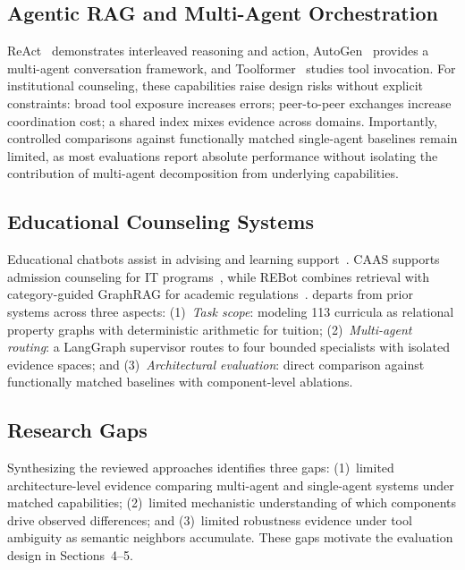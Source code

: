 \subsection{Agentic RAG and Multi-Agent Orchestration}
\label{sec:agentic_multiagent}

ReAct~\cite{yao2023react} demonstrates interleaved reasoning and action, AutoGen~\cite{wu2023autogen} provides a multi-agent conversation framework, and Toolformer~\cite{schick2023toolformer} studies tool invocation. For institutional counseling, these capabilities raise design risks without explicit constraints: broad tool exposure increases errors; peer-to-peer exchanges increase coordination cost; a shared index mixes evidence across domains. Importantly, controlled comparisons against functionally matched single-agent baselines remain limited, as most evaluations report absolute performance without isolating the contribution of multi-agent decomposition from underlying capabilities.

\subsection{Educational Counseling Systems}
\label{sec:educational_counseling}

Educational chatbots assist in advising and learning support~\cite{wollny2021chatbots}. CAAS supports admission counseling for IT programs~\cite{ma2023caas}, while REBot combines retrieval with category-guided GraphRAG for academic regulations~\cite{ma2025rebot}. \system{} departs from prior systems across three aspects: (1)~\emph{Task scope}: modeling 113 curricula as relational property graphs with deterministic arithmetic for tuition; (2)~\emph{Multi-agent routing}: a LangGraph supervisor routes to four bounded specialists with isolated evidence spaces; and (3)~\emph{Architectural evaluation}: direct comparison against functionally matched baselines with component-level ablations.

\subsection{Research Gaps}
\label{sec:gaps}

Synthesizing the reviewed approaches identifies three gaps: (1)~limited architecture-level evidence comparing multi-agent and single-agent systems under matched capabilities; (2)~limited mechanistic understanding of which components drive observed differences; and (3)~limited robustness evidence under tool ambiguity as semantic neighbors accumulate. These gaps motivate the evaluation design in Sections~4--5.
